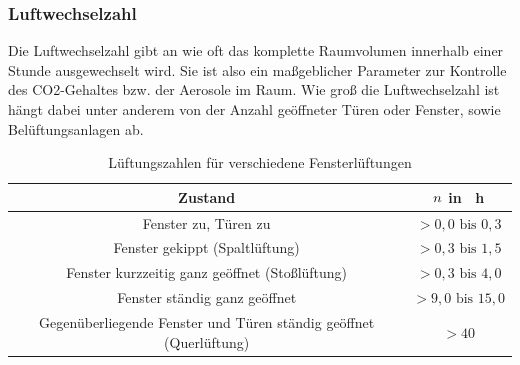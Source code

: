 \subsubsection*{Luftwechselzahl}
Die Luftwechselzahl gibt an wie oft das komplette Raumvolumen innerhalb einer Stunde ausgewechselt wird. Sie ist also ein maßgeblicher Parameter zur Kontrolle des CO2-Gehaltes bzw. der Aerosole im Raum. Wie groß die Luftwechselzahl ist hängt dabei unter anderem von der Anzahl geöffneter Türen oder Fenster, sowie Belüftungsanlagen ab.

\begin{table}[h!]
	\renewcommand*{\arraystretch}{1.2}
	\centering
	\caption{Lüftungszahlen für verschiedene Fensterlüftungen \cite{Bosy.17.10.2020}}
	\label{tab:lueftungen}
	\begin{tabulary}{1.1\textwidth}{C|C}
		\hline
		\textbf{Zustand} 	& \textbf{$\boldmath n$ in \si{\per \hour}}\\
		\hline
		Fenster zu, Türen zu 												& $> 0,0 \text{ bis } 0,3$\\
		Fenster gekippt (Spaltlüftung)  						& $> 0,3 \text{ bis } 1,5$\\
		Fenster kurzzeitig ganz geöffnet (Stoßlüftung) & $> 0,3 \text{ bis } 4,0$\\
		Fenster ständig ganz geöffnet & $> 9,0 \text{ bis } 15,0$\\
		Gegenüberliegende Fenster und Türen ständig geöffnet (Querlüftung) & $> 40$\\
		\hline			
	\end{tabulary}
\end{table}
\FloatBarrier
	
